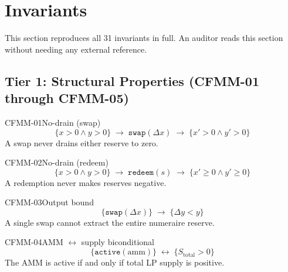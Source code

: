 
\section{Invariants}\label{sec:invariants}

This section reproduces all 31 invariants in full. An auditor reads this section
without needing any external reference.

\subsection{Tier 1: Structural Properties (CFMM-01 through CFMM-05)}

\begin{invariant}{CFMM-01}{No-drain (swap)}
\[
  \{x > 0 \land y > 0\} \;\longrightarrow\; \texttt{swap}(\Delta x)
  \;\longrightarrow\; \{x' > 0 \land y' > 0\}
\]
A swap never drains either reserve to zero.
\end{invariant}

\begin{invariant}{CFMM-02}{No-drain (redeem)}
\[
  \{x > 0 \land y > 0\} \;\longrightarrow\; \texttt{redeem}(s)
  \;\longrightarrow\; \{x' \geq 0 \land y' \geq 0\}
\]
A redemption never makes reserves negative.
\end{invariant}

\begin{invariant}{CFMM-03}{Output bound}
\[
  \{\texttt{swap}(\Delta x)\} \;\longrightarrow\; \{\Delta y < y\}
\]
A single swap cannot extract the entire numeraire reserve.
\end{invariant}

\begin{invariant}{CFMM-04}{AMM $\leftrightarrow$ supply biconditional}
\[
  \{\texttt{active}(\text{amm})\} \;\longleftrightarrow\; \{S_{\text{total}} > 0\}
\]
The AMM is active if and only if total LP supply is positive.
\end{invariant}

